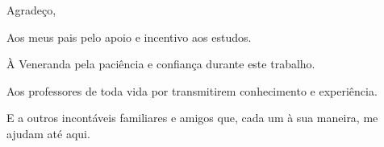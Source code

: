 \begin{agradecimentos}

	\vspace{1cm}

\begin{flushright}

	\noindent 
	Agradeço,

Aos meus pais pelo apoio e incentivo aos estudos. 

À Veneranda pela paciência e confiança durante este trabalho. 

Aos professores de toda vida por transmitirem conhecimento e experiência.

E a outros incontáveis familiares e amigos que, cada um à sua maneira, me ajudam até aqui.

\end{flushright}
 
\end{agradecimentos}
